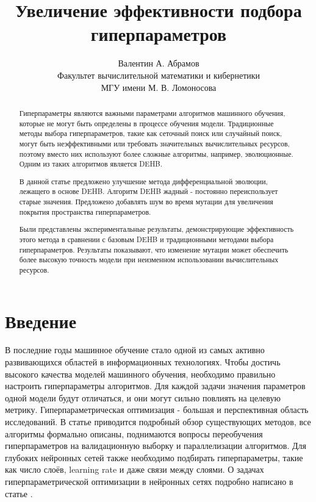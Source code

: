 \documentclass{article}
\title{Увеличение эффективности подбора гиперпараметров}
\author{ Валентин А. Абрамов \\
	Факультет вычислительной математики и кибернетики\\
	МГУ имени М. В. Ломоносова\\
}
\date{}
\begin{document}
\maketitle

\begin{abstract}
Гиперпараметры являются важными параметрами алгоритмов машинного обучения, которые не могут быть определены в процессе обучения модели. Традиционные методы выбора гиперпараметров, такие как сеточный поиск или случайный поиск, могут быть неэффективными или требовать значительных вычислительных ресурсов, поэтому вместо них используют более сложные алгоритмы, например, эволюционные. Одним из таких алгоритмов является DEHB.

В данной статье предложено улучшение метода дифференциальной эволюции, лежащего в основе DEHB. Алгоритм DEHB жадный - постоянно переиспользует старые значения. Предложено добавлять шум во время мутации для увеличения покрытия пространства гиперпараметров.

Были представлены экспериментальные результаты, демонстрирующие эффективность этого метода в сравнении с базовым DEHB и традиционными методами выбора гиперпараметров. Результаты показывают, что изменение мутации может обеспечить более высокую точность модели при неизменном использовании вычислительных ресурсов.

\end{abstract}



\section{Введение}

В последние годы машинное обучение стало одной из самых активно развивающихся областей в информационных технологиях. Чтобы достичь высокого качества моделей машинного обучения, необходимо правильно настроить гиперпараметры алгоритмов. Для каждой задачи значения параметров одной модели будут отличаться, и они могут сильно повлиять на целевую метрику. 
Гиперпараметрическая оптимизация - большая и перспективная область исследований. В статье \cite{bischl2021hyperparameter} приводится подробный обзор существующих методов, все алгоритмы формально описаны, поднимаются вопросы переобучения гиперпараметров на валидационную выборку и параллелизации алгоритмов. Для глубоких нейронных сетей также необходимо подбирать гиперпараметры, такие как число слоёв, learning rate и даже связи между слоями. О задачах гиперпараметрической оптимизации в нейронных сетях подробно написано в статье \cite{Talbi2020OptimizationOD}.
\end{document}
